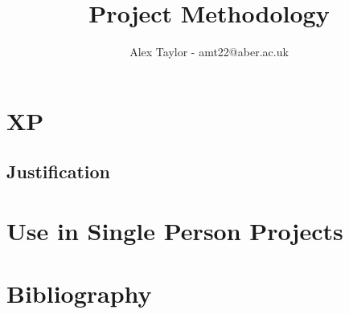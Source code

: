 \documentclass{article}
\title{Project Methodology}
\author{Alex Taylor - amt22@aber.ac.uk}
\begin{document}
\maketitle
\tableofcontents
\thispagestyle{empty}

\newpage

\section{XP}
\subsection{Justification}
\newpage
\section{Use in Single Person Projects}
\newpage
\section{Bibliography}
\end{document}
